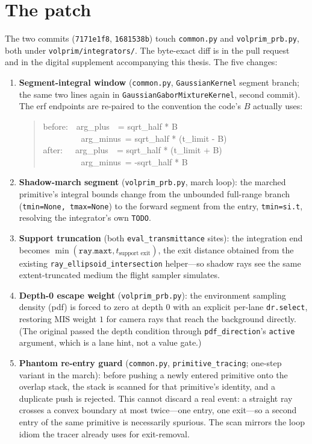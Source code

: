 \section{The patch}
\label{app:corrections-patch}

The two commits (\texttt{7171e1f8}, \texttt{1681538b}) touch \texttt{common.py} and
\texttt{volprim\_prb.py}, both under \texttt{volprim/integrators/}. The
byte-exact diff is in the pull request~\cite{KramarzVolprimFixes2026} and in the digital
supplement accompanying this thesis. The five changes:

\begin{enumerate}
  \item \textbf{Segment-integral window} (\texttt{common.py}, \texttt{GaussianKernel} segment
  branch; the same two lines again in \texttt{GaussianGaborMixtureKernel}, second commit).
  The erf endpoints are re-paired to the convention the code's $B$ actually uses:
  \begin{quote}\small\ttfamily
  before:~~arg\_plus~~= sqrt\_half * B\\
  ~~~~~~~~~arg\_minus~= sqrt\_half * (t\_limit - B)\\[3pt]
  after:~~~arg\_plus~~= sqrt\_half * (t\_limit + B)\\
  ~~~~~~~~~arg\_minus~= -sqrt\_half * B
  \end{quote}
  \item \textbf{Shadow-march segment} (\texttt{volprim\_prb.py}, march loop): the marched
  primitive's integral bounds change from the unbounded full-range branch
  (\texttt{tmin=None, tmax=None}) to the forward segment from the entry,
  \texttt{tmin=si.t}, resolving the integrator's own \texttt{TODO}.
  \item \textbf{Support truncation} (both \texttt{eval\_transmittance} sites): the
  integration end becomes $\min(\texttt{ray.maxt}, t_{\text{support exit}})$, the exit
  distance obtained from the existing \texttt{ray\_ellipsoid\_intersection} helper---so
  shadow rays see the same extent-truncated medium the flight sampler simulates.
  \item \textbf{Depth-0 escape weight} (\texttt{volprim\_prb.py}): the environment sampling density (pdf) is forced to zero at depth $0$ with an explicit per-lane \texttt{dr.select}, restoring MIS
  weight $1$ for camera rays that reach the background directly. (The original passed the
  depth condition through \texttt{pdf\_direction}'s \texttt{active} argument, which is a
  lane hint, not a value gate.)
  \item \textbf{Phantom re-entry guard} (\texttt{common.py}, \texttt{primitive\_tracing};
  one-step variant in the march): before pushing a newly entered primitive onto the overlap
  stack, the stack is scanned for that primitive's identity, and a duplicate push is
  rejected. This cannot discard a real event: a straight ray crosses a convex boundary at most
  twice---one entry, one exit---so a second entry of the same primitive is necessarily spurious.
  The scan mirrors the loop idiom the tracer already uses for exit-removal.
\end{enumerate}

